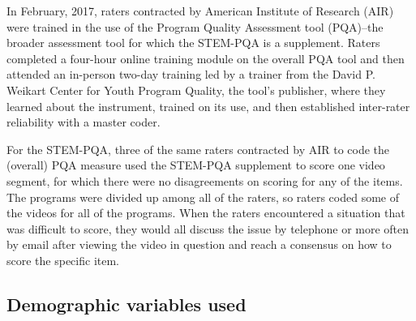 \documentclass[]{book}
\theoremstyle{definition}
\theoremstyle{definition}
\theoremstyle{definition}
\theoremstyle{remark}
\begin{document}
\begin{table}

\caption{\label{tab:unnamed-chunk-6}Coding Frame for Work With Data}
\centering
{}
\end{table}

In February, 2017, raters contracted by American Institute of Research
(AIR) were trained in the use of the Program Quality Assessment tool
(PQA)--the broader assessment tool for which the STEM-PQA is a
supplement. Raters completed a four-hour online training module on the
overall PQA tool and then attended an in-person two-day training led by
a trainer from the David P. Weikart Center for Youth Program Quality,
the tool's publisher, where they learned about the instrument, trained
on its use, and then established inter-rater reliability with a master
coder.

For the STEM-PQA, three of the same raters contracted by AIR to code the
(overall) PQA measure used the STEM-PQA supplement to score one video
segment, for which there were no disagreements on scoring for any of the
items. The programs were divided up among all of the raters, so raters
coded some of the videos for all of the programs. When the raters
encountered a situation that was difficult to score, they would all
discuss the issue by telephone or more often by email after viewing the
video in question and reach a consensus on how to score the specific
item.

\subsection{Demographic variables
used}\label{demographic-variables-used}
\end{document}
